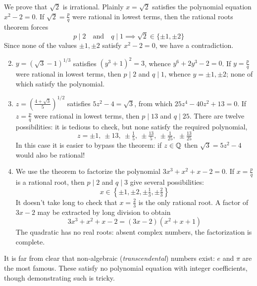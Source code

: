 \begin{examples}{}{}
	\exstart We prove that $\sqrt 2$ is irrational.	Plainly $x=\sqrt 2$ satisfies the polynomial equation $x^2-2=0$. If $\sqrt 2=\frac pq$ were rational in lowest terms, then the rational roots theorem forces
	\[
		p\mid 2\quad\text{and}\quad q\mid 1\implies \sqrt 2\in\{\pm 1,\pm 2\}
	\]
	Since none of the values $\pm 1,\pm 2$ satisfy $x^2-2=0$, we have a contradiction.

	\begin{enumerate}\setcounter{enumi}{1}
		\item $y=(\sqrt 3-1)^{1/3}$ satisfies $(y^3+1)^2=3$, whence $y^6+2y^3-2=0$. If $y=\frac pq$ were rational in lowest terms, then $p\mid 2$ and $q\mid 1$, whence $y=\pm 1,\pm 2$; none of which satisfy the polynomial.
		
		\item $z=\left(\frac{4+\sqrt 3}{5}\right)^{1/2}$ satisfies $5z^2-4=\sqrt 3$, from which $25z^4-40z^2+13=0$. If $z=\frac pq$ were rational in lowest terms, then $p\mid 13$ and $q\mid 25$. There are twelve possibilities: it is tedious to check, but none satisfy the required polynomial,
		\[
			z=\pm 1,\ \pm 13,\ \pm\tfrac 15,\ \pm\tfrac{13}5,\ \pm\tfrac 1{25},\ \pm\tfrac{13}{25}
		\]
		In this case it is easier to bypass the theorem: if $z\in\mathbb{Q}$ then $\sqrt 3=5z^2-4$ would also be rational!
		
		\item We use the theorem to factorize the polynomial $3x^3+x^2+x-2=0$. If $x=\frac pq$ is a rational root, then $p\mid 2$ and $q\mid 3$ give several possibilities:
		\[
			x\in\left\{\pm 1,\pm 2,\pm\tfrac 13,\pm\tfrac 23\right\}
		\]
		It doesn't take long to check that $x=\frac 23$ is the only rational root. A factor of $3x-2$ may be extracted by long division to obtain
		\[
			3x^3+x^2+x-2=(3x-2)(x^2+x+1)
		\]
		The quadratic has no real roots: absent complex numbers, the factorization is complete.
	\end{enumerate}
\end{examples}

It is far from clear that non-algebraic (\emph{transcendental}) numbers exist: $e$ and $\pi$ are the most famous. These satisfy no polynomial equation with integer coefficients, though demonstrating such is tricky.


